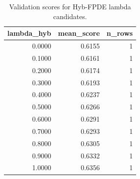 \begin{table}[t]
\caption{Validation scores for Hyb-FPDE lambda candidates.}
\label{tab:lambda_distribution_computed}
\centering
\begin{tabular}{rrr}
\toprule
lambda\_hyb & mean\_score & n\_rows \\
\midrule
0.0000 & 0.6155 & 1 \\
0.1000 & 0.6161 & 1 \\
0.2000 & 0.6174 & 1 \\
0.3000 & 0.6193 & 1 \\
0.4000 & 0.6237 & 1 \\
0.5000 & 0.6266 & 1 \\
0.6000 & 0.6291 & 1 \\
0.7000 & 0.6293 & 1 \\
0.8000 & 0.6305 & 1 \\
0.9000 & 0.6332 & 1 \\
1.0000 & 0.6356 & 1 \\
\bottomrule
\end{tabular}

\end{table}

